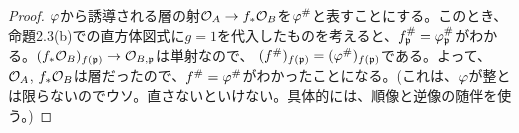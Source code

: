 \begin{proof}
  ${\varphi}$から誘導される層の射$\mathcal{O}_A \to f_*\mathcal{O}_B$を${\varphi}^{\#}$と表すことにする。このとき、命題2.3(b)での直方体図式に$g=1$を代入したものを考えると、$f^{\#}_{\mathfrak{p}} = {\varphi}^{\#}_{\mathfrak{p}}$がわかる。$(f_*\mathcal{O}_B)_{f(\mathfrak{p})} \to \mathcal{O}_{B,\mathfrak{p}}$は単射なので、
  $(f^{\#})_{f(\mathfrak{p})} = ({\varphi}^{\#})_{f(\mathfrak{p})} $である。よって、$\mathcal{O}_A$, $f_*\mathcal{O}_B$は層だったので、$f^{\#} = {\varphi}^{\#}$がわかったことになる。(これは、${\varphi}$が整とは限らないのでウソ。直さないといけない。具体的には、順像と逆像の随伴を使う。)
\end{proof}
